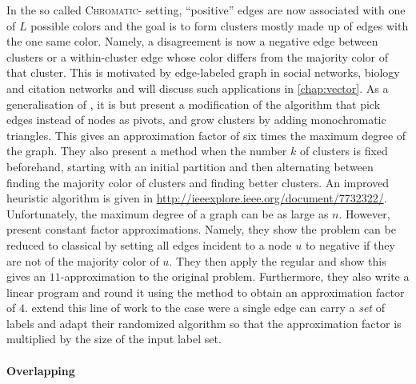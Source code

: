 In the so called \textsc{Chromatic}-\pcc{} setting, \enquote{positive} edges are now associated with
one of $L$ possible colors and the goal is to form clusters mostly made up of edges with the one same
color. Namely, a disagreement is now a negative edge between clusters or a within-cluster edge
whose color differs from the majority color of that cluster. This is motivated by edge-labeled graph
in social networks, biology and citation networks and will discuss such applications in
\autoref{chap:vector}. As a generalisation of \pcc{}, it is \NPc{} but \textcite{Bonchi2012a}
present a modification of the \ccpivot{} algorithm that pick edges instead of nodes as pivots, and
grow clusters by adding monochromatic triangles. This gives an approximation factor of six times the
maximum degree of the graph. They also present a method when the number $k$ of clusters is fixed
beforehand, starting with an initial partition and then alternating between finding the majority
color of clusters and finding better clusters. An improved heuristic algorithm is given in
\url{http://ieeexplore.ieee.org/document/7732322/}. Unfortunately, the maximum degree of a graph can be
as large as $n$. However, \textcite{Anava2015} present constant factor approximations. Namely, they
show the problem can be reduced to classical \pcc{} by setting all edges incident to a node $u$ to
negative if they are not of the majority color of $u$. They then apply the regular \ccpivot{} and
show this gives an $11$-approximation to the original problem. Furthermore, they also write a linear
program and round it using the \regionGrow{} method to obtain an
approximation factor of $4$. \Textcite{multiChromatic15} extend this line of work to the case were a
single edge can carry a \emph{set} of labels and adapt their randomized algorithm so that the
approximation factor is multiplied by the size of the input label set.

\paragraph{Overlapping \pcc{}}

